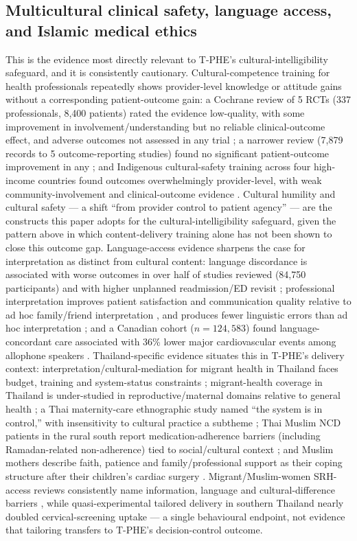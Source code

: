 \documentclass[11pt]{article}
\newcommand{\tphe}{T\mbox{-}PHE}
\begin{document}
\subsection{Multicultural clinical safety, language access, and Islamic medical ethics}
This is the evidence most directly relevant to \tphe{}'s cultural-intelligibility safeguard, and it is consistently cautionary. Cultural-competence training for health professionals repeatedly shows provider-level knowledge or attitude gains without a corresponding patient-outcome gain: a Cochrane review of 5 RCTs (337 professionals, 8{,}400 patients) rated the evidence low-quality, with some improvement in involvement/understanding but no reliable clinical-outcome effect, and adverse outcomes not assessed in any trial \cite{ref55}; a narrower review (7{,}879 records to 5 outcome-reporting studies) found no significant patient-outcome improvement in any \cite{ref56}; and Indigenous cultural-safety training across four high-income countries found outcomes overwhelmingly provider-level, with weak community-involvement and clinical-outcome evidence \cite{ref57}. Cultural humility \cite{ref58} and cultural safety --- a shift ``from provider control to patient agency'' \cite{ref59} --- are the constructs this paper adopts for the cultural-intelligibility safeguard, given the pattern above in which content-delivery training alone has not been shown to close this outcome gap. Language-access evidence sharpens the case for interpretation as distinct from cultural content: language discordance is associated with worse outcomes in over half of studies reviewed (84{,}750 participants) \cite{ref60} and with higher unplanned readmission/ED revisit \cite{ref61}; professional interpretation improves patient satisfaction and communication quality relative to ad hoc family/friend interpretation \cite{ref62}, and produces fewer linguistic errors than ad hoc interpretation \cite{ref63}; and a Canadian cohort ($n=124{,}583$) found language-concordant care associated with 36\% lower major cardiovascular events among allophone speakers \cite{ref64}. Thailand-specific evidence situates this in \tphe{}'s delivery context: interpretation/cultural-mediation for migrant health in Thailand faces budget, training and system-status constraints \cite{ref65}; migrant-health coverage in Thailand is under-studied in reproductive/maternal domains relative to general health \cite{ref66}; a Thai maternity-care ethnographic study named ``the system is in control,'' with insensitivity to cultural practice a subtheme \cite{ref67}; Thai Muslim NCD patients in the rural south report medication-adherence barriers (including Ramadan-related non-adherence) tied to social/cultural context \cite{ref68}; and Muslim mothers describe faith, patience and family/professional support as their coping structure after their children's cardiac surgery \cite{ref69}. Migrant/Muslim-women SRH-access reviews consistently name information, language and cultural-difference barriers \cite{ref70,ref20}, while quasi-experimental tailored delivery in southern Thailand nearly doubled cervical-screening uptake \cite{ref71} --- a single behavioural endpoint, not evidence that tailoring transfers to \tphe{}'s decision-control outcome.
\end{document}
